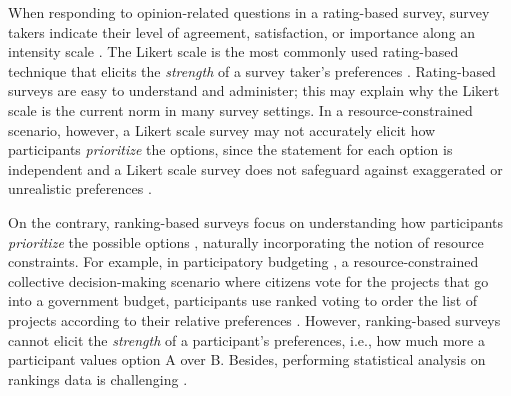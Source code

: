 

When responding to opinion-related questions in a rating-based survey, survey takers indicate their level of agreement, satisfaction, or importance along an intensity scale \cite{moors2016two}. The Likert scale is the most commonly used rating-based technique that elicits the \textit{strength} of a survey taker's preferences \cite{likert1932technique}. Rating-based surveys are easy to understand and administer; this may explain why the Likert scale is the current norm in many survey settings. In a resource-constrained scenario, however, a Likert scale survey may not accurately elicit how participants \textit{prioritize} the options, since the statement for each option is independent \cite{alwin1985measurement} and a Likert scale survey does not safeguard against exaggerated or unrealistic preferences \cite{araujo2017much, vavreck2007exaggerated}.

On the contrary, ranking-based surveys focus on understanding how participants \textit{prioritize} the possible options \cite{moors2016two}, naturally incorporating the notion of resource constraints. For example, in participatory budgeting \cite{cabannes2004participatory}, a resource-constrained collective decision-making scenario where citizens vote for the projects that go into a government budget, participants use ranked voting to order the list of projects according to their relative preferences \cite{benade2020preference}. However, ranking-based surveys cannot elicit the \textit{strength} of a participant's preferences, i.e., how much more a participant values option A over B. Besides, performing statistical analysis on rankings data is challenging \cite{alwin1985measurement}.

